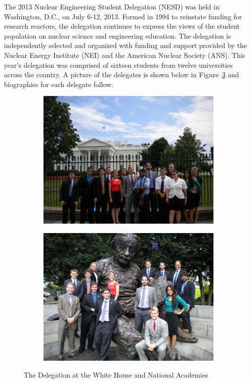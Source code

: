 The 2013 Nuclear Engineering Student Delegation (NESD) was held in Washington,
D.C., on July 6-12, 2013. Formed in 1994 to reinstate funding for research
reactors, the delegation continues to express the views of the student
population on nuclear science and engineering education. The delegation is
independently selected and organized with funding and support provided by the
Nuclear Energy Institute (NEI) and the American Nuclear Society (ANS). This
year’s delegation was comprised of sixteen students from twelve universities
across the country. A picture of the delegates is shown below in
Figure~\ref{fig:delegates} and biographies for each delegate follow.

\begin{figure}[h]
\centering
\begin{subfigure}{.5 \textwidth}
  \centering
  \includegraphics[width=.95 \linewidth]{NESD_WH.jpg}
  \label{fig:whitehouse}
\end{subfigure}%
\begin{subfigure}{.5\textwidth}
  \centering
  \includegraphics[width=.95 \linewidth]{NESD_Ein.jpg}
  \label{fig:einstein}
\end{subfigure}
\caption{The Delegation at the White House and National Academies}
\label{fig:delegates}
\end{figure}

